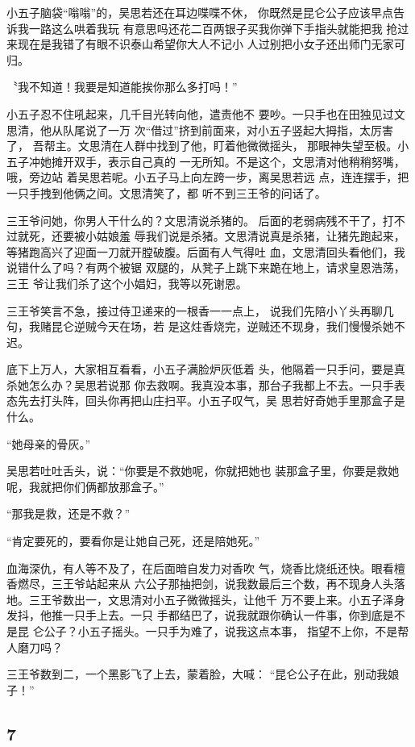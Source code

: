 小五子脑袋“嗡嗡”的，吴思若还在耳边喋喋不休，
你既然是昆仑公子应该早点告诉我一路这么哄着我玩
有意思吗还花二百两银子买我你弹下手指头就能把我
抢过来现在是我错了有眼不识泰山希望你大人不记小
人过别把小女子还出师门无家可归。

〝我不知道！我要是知道能挨你那么多打吗！”

小五子忍不住吼起来，几千目光转向他，遣责他不
要吵。一只手也在田独见过文思清，他从队尾说了一万
次“借过”挤到前面来，对小五子竖起大拇指，太厉害了，
吾帮主。文思清在人群中找到了他，盯着他微微摇头，
那眼神失望至极。小五子冲她摊开双手，表示自己真的
一无所知。不是这个，文思清对他稍稍努嘴，哦，旁边站
着吴思若呢。小五子马上向左跨一步，离吴思若远
点，连连摆手，把一只手拽到他俩之间。文思清笑了，都
听不到三王爷的问话了。

三王爷问她，你男人干什么的？文思清说杀猪的。
后面的老弱病残不干了，打不过就死，还要被小姑娘羞
辱我们说是杀猪。文思清说真是杀猪，让猪先跑起来，
等猪跑高兴了迎面一刀就开膛破腹。后面有人气得吐
血，文思清回头看他们，我说错什么了吗？有两个被锯
双腿的，从凳子上跳下来跪在地上，请求皇恩浩荡，三王
爷让我们杀了这个小娼妇，我等以死谢恩。

三王爷笑言不急，接过侍卫递来的一根香一一点上，
说我们先陪小丫头再聊几句，我赌昆仑逆贼今天在场，若
是这炷香烧完，逆贼还不现身，我们慢慢杀她不迟。

底下上万人，大家相互看看，小五子满脸炉灰低着
头，他隔着一只手问，要是真杀她怎么办？吴思若说那
你去救啊。我真没本事，那台子我都上不去。一只手表
态先去打头阵，回头你再把山庄扫平。小五子叹气，吴
思若好奇她手里那盒子是什么。

“她母亲的骨灰。”

吴思若吐吐舌头，说：“你要是不救她呢，你就把她也
装那盒子里，你要是救她呢，我就把你们俩都放那盒子。”

“那我是救，还是不救？”

“肯定要死的，要看你是让她自己死，还是陪她死。”

血海深仇，有人等不及了，在后面暗自发力对香吹
气，烧香比烧纸还快。眼看檀香燃尽，三王爷站起来从
六公子那抽把剑，说我数最后三个数，再不现身人头落
地。三王爷数出一，文思清对小五子微微摇头，让他千
万不要上来。小五子泽身发抖，他推一只手上去。一只
手都结巴了，说我就跟你确认一件事，你到底是不是昆
仑公子？小五子摇头。一只手为难了，说我这点本事，
指望不上你，不是帮人磨刀吗？

三王爷数到二，一个黑影飞了上去，蒙着脸，大喊：
“昆仑公子在此，别动我娘子！”
\newline

{\centering\subsection{7}}

